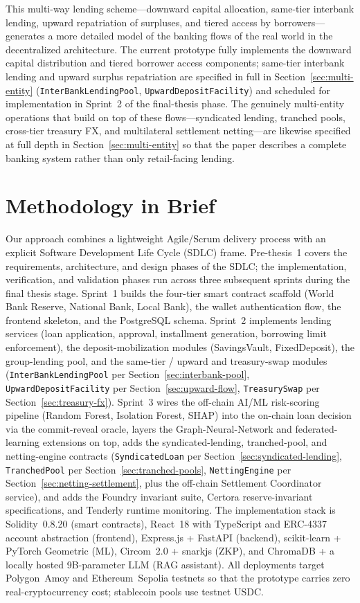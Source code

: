 \documentclass[12pt,a4paper]{report}
\begin{document}
This multi-way lending scheme---downward capital allocation, same-tier interbank lending, upward repatriation of surpluses, and tiered access by borrowers---generates a more detailed model of the banking flows of the real world in the decentralized architecture. The current prototype fully implements the downward capital distribution and tiered borrower access components; same-tier interbank lending and upward surplus repatriation are specified in full in Section~\ref{sec:multi-entity} (\texttt{InterBankLendingPool}, \texttt{UpwardDepositFacility}) and scheduled for implementation in Sprint~2 of the final-thesis phase. The genuinely multi-entity operations that build on top of these flows---syndicated lending, tranched pools, cross-tier treasury FX, and multilateral settlement netting---are likewise specified at full depth in Section~\ref{sec:multi-entity} so that the paper describes a complete banking system rather than only retail-facing lending.

\section{Methodology in Brief}

Our approach combines a lightweight Agile/Scrum delivery process with an explicit Software Development Life Cycle (SDLC) frame. Pre-thesis~1 covers the requirements, architecture, and design phases of the SDLC; the implementation, verification, and validation phases run across three subsequent sprints during the final thesis stage. Sprint~1 builds the four-tier smart contract scaffold (World Bank Reserve, National Bank, Local Bank), the wallet authentication flow, the frontend skeleton, and the PostgreSQL schema. Sprint~2 implements lending services (loan application, approval, installment generation, borrowing limit enforcement), the deposit-mobilization modules (SavingsVault, FixedDeposit), the group-lending pool, and the same-tier / upward and treasury-swap modules (\texttt{InterBankLendingPool} per Section~\ref{sec:interbank-pool}, \texttt{UpwardDepositFacility} per Section~\ref{sec:upward-flow}, \texttt{TreasurySwap} per Section~\ref{sec:treasury-fx}). Sprint~3 wires the off-chain AI/ML risk-scoring pipeline (Random Forest, Isolation Forest, SHAP) into the on-chain loan decision via the commit-reveal oracle, layers the Graph-Neural-Network and federated-learning extensions on top, adds the syndicated-lending, tranched-pool, and netting-engine contracts (\texttt{SyndicatedLoan} per Section~\ref{sec:syndicated-lending}, \texttt{TranchedPool} per Section~\ref{sec:tranched-pools}, \texttt{NettingEngine} per Section~\ref{sec:netting-settlement}, plus the off-chain Settlement Coordinator service), and adds the Foundry invariant suite, Certora reserve-invariant specifications, and Tenderly runtime monitoring. The implementation stack is Solidity~0.8.20 (smart contracts), React~18 with TypeScript and ERC-4337 account abstraction (frontend), Express.js + FastAPI (backend), scikit-learn + PyTorch Geometric (ML), Circom~2.0 + snarkjs (ZKP), and ChromaDB + a locally hosted 9B-parameter LLM (RAG assistant). All deployments target Polygon~Amoy and Ethereum~Sepolia testnets so that the prototype carries zero real-cryptocurrency cost; stablecoin pools use testnet USDC.
\end{document}
